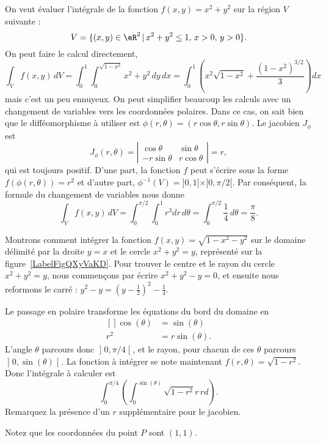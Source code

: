 \begin{example}
	On veut évaluer l'intégrale de la fonction \( f(x,y)= x^2+y^2\) sur la région \( V\) suivante :
	\[
		V=\{(x,y) \in \eR^2\,\vert\, x^2+y^2\leq 1,\, x>0,\, y>0\}.
	\]
	On peut faire le calcul directement,
	\[
		\int_{V}f(x,y)\, dV=\int_0^1\int_0^{\sqrt{1-x^2}}x^2+y^2\, dy\,dx=\int_0^1\left(x^2\sqrt{1-x^2} + \frac{(1-x^2)^{3/2}}{3}\right) dx
	\]
	mais c'est un peu ennuyeux. On peut simplifier beaucoup les calculs avec un changement de variables vers les coordonnées polaires. Dans ce cas, on sait bien que le difféomorphisme à utiliser est \( \phi(r,\theta)=(r\cos \theta, r\sin\theta)\). Le jacobien  \( J_{\phi}\) est
	\begin{equation}
		J_{\phi}(r, \theta)= \left\vert\begin{array}{cc}
			\cos \theta   & \sin \theta  \\
			-r\sin \theta & r\cos \theta
		\end{array}\right\vert= r,
	\end{equation}
	qui est toujours positif. D'une part, la fonction \( f\) peut s'écrire sous la forme \( f(\phi(r,\theta))=r^2\) et d'autre part, \( \phi^{-1}(V)=]0,1]\times]0, \pi/2[\). Par conséquent, la formule du changement de variables nous donne
	\[
		\int_{V}f(x,y)\, dV=\int_0^{\pi/2}\int_0^{1}r^3 dr\,d\theta=\int_0^{\pi/2}\frac{1}{4}\,d\theta=\frac{\pi}{8}.
	\]
\end{example}

\begin{example}
	Montrons comment intégrer la fonction \( f(x,y)=\sqrt{1-x^2-y^2}\) sur le domaine délimité par la droite \( y=x\) et le cercle \( x^2+y^2=y\), représenté sur la figure~\ref{LabelFigQXyVaKD}. Pour trouver le centre et le rayon du cercle \( x^2+y^2=y\), nous commençons par écrire \( x^2+y^2-y=0\), et ensuite nous reformons le carré : \( y^2-y=(y-\frac{ 1 }{2})^2-\frac{1}{ 4 }\).
	\newcommand{\CaptionFigQXyVaKD}{Passage en polaire pour intégrer sur un morceau de cercle.}
	

	Le passage en polaire transforme les équations du bord du domaine en
	\begin{equation}
		\begin{aligned}[]
			\cos(\theta) & =\sin(\theta)   \\
			r^2          & =r\sin(\theta).
		\end{aligned}
	\end{equation}
	L'angle \( \theta\) parcours donc \( \mathopen] 0 , \pi/4 \mathclose[\), et le rayon, pour chacun de ces \( \theta\) parcours \( \mathopen] 0 , \sin(\theta) \mathclose[\). La fonction à intégrer se note maintenant \( f(r,\theta)=\sqrt{1-r^2}\). Donc l'intégrale à calculer est
	\begin{equation}		\label{PgRapIntMultFubiniBoutCercle}
		\int_{0}^{\pi/4}\left( \int_0^{\sin(\theta)}\sqrt{1-r^2}r\,rd \right).
	\end{equation}
	Remarquez la présence d'un \( r\) supplémentaire pour le jacobien.

	Notez que les coordonnées du point \( P\) sont \( (1,1)\).
\end{example}

